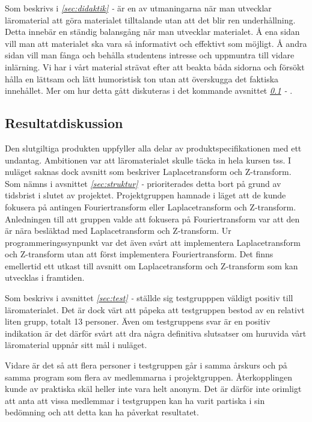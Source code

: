 \documentclass[12pt,a4paper,twoside,openright]{article}
\begin{document}
Som beskrivs i \textit{\ref{sec:didaktik} - } är
en av utmaningarna när man utvecklar läromaterial att göra materialet
tilltalande utan att det blir ren underhållning. Detta innebär en
ständig balansgång när man utvecklar materialet. Å ena sidan vill man
att materialet ska vara så informativt och effektivt som möjligt. Å
andra sidan vill man fånga och behålla studentens intresse och
uppmuntra till vidare inlärning. Vi har i vårt material strävat efter
att beakta båda sidorna och försökt hålla en lättsam och lätt
humoristisk ton utan att överskugga det faktiska innehållet. Mer om
hur detta gått diskuteras i det kommande avsnittet
\textit{\ref{sec:resDisk} - }.

\subsection{Resultatdiskussion}
\label{sec:resDisk}
Den slutgiltiga produkten uppfyller alla delar av
produktspecifikationen med ett undantag. Ambitionen var att
läromaterialet skulle täcka in hela kursen \gls{tss}. I nuläget
saknas dock avsnitt som beskriver Laplacetransform och
Z-transform. Som nämns i avsnittet \textit{\ref{sec:struktur} -
  } prioriterades detta bort på grund av
tidsbrist i slutet av projektet. Projektgruppen hamnade i läget att de
kunde fokusera på antingen Fouriertransform eller Laplacetransform och
Z-transform. Anledningen till att gruppen valde att fokusera på
Fouriertransform var att den är nära besläktad med Laplacetransform
och Z-transform. Ur programmeringssynpunkt var det även svårt att
implementera Laplacetransform och Z-transform utan att först
implementera Fouriertransform. Det finns emellertid ett utkast till
avsnitt om Laplacetransform och Z-transform som kan utvecklas i
framtiden.

Som beskrivs i avsnittet \textit{\ref{sec:test} - }
ställde sig testgrupppen väldigt positiv till läromaterialet. Det är
dock värt att påpeka att testgruppen bestod av en relativt liten
grupp, totalt 13 personer.  Även om testgruppens svar är en positiv
indikation är det därför svårt att dra några definitiva slutsatser om
huruvida vårt läromaterial uppnår sitt mål i nuläget.

Vidare är det så att flera personer i testgruppen går i samma årskurs
och på samma program som flera av medlemmarna i
projektgruppen. Återkopplingen kunde av praktiska skäl heller inte
vara helt anonym. Det är därför inte orimligt att anta att vissa
medlemmar i testgruppen kan ha varit partiska i sin bedömning och att
detta kan ha påverkat resultatet.
\end{document}
